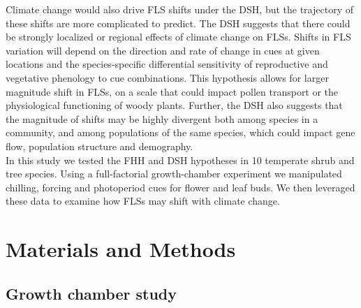 \documentclass[12pt]{article}\usepackage[]{graphicx}\usepackage[]{color}
\begin{document}
\noindent Climate change would also drive FLS shifts under the DSH, but the trajectory of these shifts are more complicated to predict. The DSH suggests that there could be strongly localized or regional effects of climate change on FLSs. Shifts in FLS variation will depend on the direction and rate of change in cues at given locations and the species-specific differential sensitivity of reproductive and vegetative phenology to cue combinations. This hypothesis allows for larger magnitude shift in FLSs, on a scale that could impact pollen transport or the physiological functioning of woody plants. Further, the DSH also suggests that the magnitude of shifts may be highly divergent both among species in a community, and among populations of the same species, which could impact gene flow, population structure and demography.\\

\noindent In this study we tested the FHH and DSH hypotheses in 10 temperate shrub and tree species. Using a full-factorial growth-chamber experiment we manipulated chilling, forcing and photoperiod cues for flower and leaf buds. We then leveraged these data to examine how FLSs may shift with climate change.\\ %

\section*{Materials and Methods}

\subsection*{Growth chamber study}
\end{document}
